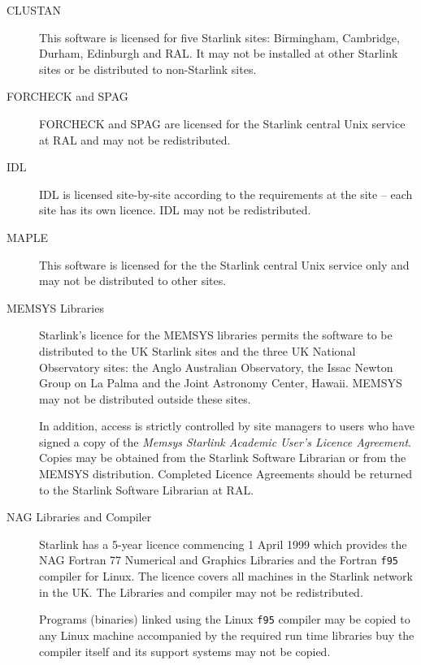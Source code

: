 \documentclass[twoside,11pt]{article}
\renewcommand{\_}{\texttt{\symbol{95}}}
\begin{document}
\begin{description}

\item[CLUSTAN]\mbox{}

This software is licensed for five Starlink sites: Birmingham, Cambridge,
Durham, Edinburgh and RAL\@.  It may not be installed at other Starlink sites
or be distributed to non-Starlink sites.

\item[FORCHECK and SPAG]\mbox{}

FORCHECK and SPAG are licensed for the Starlink central Unix service at RAL
and may not be redistributed.

\item[IDL]\mbox{}

IDL is licensed site-by-site according to the requirements at the site -- each
site has its own licence.  IDL may not be redistributed.

\item[MAPLE]\mbox{}

This software is licensed for the the Starlink central Unix service only
and may not be distributed to other sites.

\item[MEMSYS Libraries]\mbox{}

Starlink's licence for the MEMSYS libraries permits the software to be
distributed to the UK Starlink sites and the three UK National Observatory
sites: the Anglo Australian Observatory, the Issac Newton Group on La Palma
and the Joint Astronomy Center, Hawaii.  MEMSYS may not be distributed outside
these sites.

In addition, access is strictly controlled by site managers to users who
have signed a copy of the \emph{Memsys Starlink Academic User's Licence
Agreement}.  Copies may be obtained from the Starlink Software Librarian
or from the MEMSYS distribution.  Completed Licence Agreements should be
returned to the Starlink Software Librarian at RAL.

\item[NAG Libraries and Compiler]\mbox{}

Starlink has a 5-year licence commencing 1 April 1999 which provides
the NAG Fortran 77 Numerical and Graphics Libraries and the Fortran
\texttt{f95} compiler for Linux.  The licence covers all machines in
the Starlink network in the UK\@.  The Libraries and compiler may not be
redistributed.

Programs (binaries) linked using the Linux \texttt{f95} compiler may be
copied to any Linux machine accompanied by the required run time libraries
buy the compiler itself and its support systems may not be copied.


\end{description}
\end{document}
